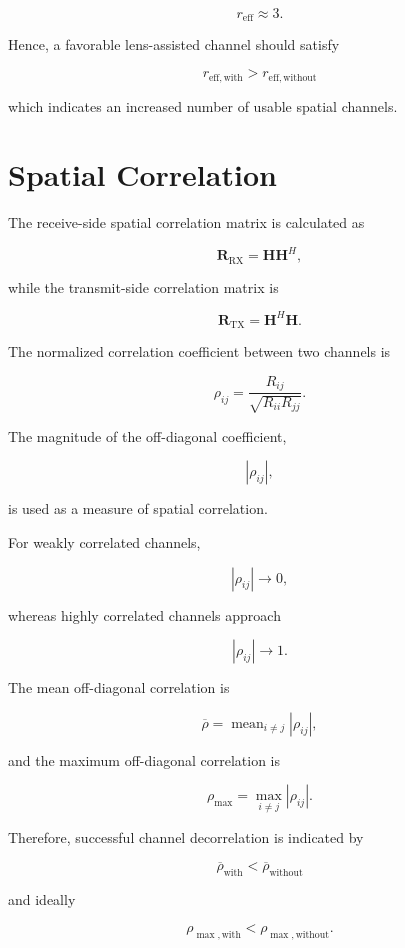 \documentclass[11pt,a4paper]{article}
\begin{document}
\[
r_{\mathrm{eff}}
\approx 3.
\]

Hence, a favorable lens-assisted channel should satisfy

\[
\boxed{
r_{\mathrm{eff,with}}
>
r_{\mathrm{eff,without}}
}
\]

which indicates an increased number of usable spatial channels.

\section{Spatial Correlation}

The receive-side spatial correlation matrix is calculated as

\[
\mathbf{R}_{\mathrm{RX}}
=
\mathbf{H}\mathbf{H}^{H},
\]

while the transmit-side correlation matrix is

\[
\mathbf{R}_{\mathrm{TX}}
=
\mathbf{H}^{H}\mathbf{H}.
\]

The normalized correlation coefficient between two channels is

\[
\rho_{ij}
=
\frac{R_{ij}}
{\sqrt{R_{ii}R_{jj}}}.
\]

The magnitude of the off-diagonal coefficient,

\[
|\rho_{ij}|,
\]

is used as a measure of spatial correlation.

For weakly correlated channels,

\[
|\rho_{ij}|
\rightarrow 0,
\]

whereas highly correlated channels approach

\[
|\rho_{ij}|
\rightarrow 1.
\]

The mean off-diagonal correlation is

\[
\overline{\rho}
=
\operatorname{mean}_{i\neq j}
|\rho_{ij}|,
\]

and the maximum off-diagonal correlation is

\[
\rho_{\max}
=
\max_{i\neq j}
|\rho_{ij}|.
\]

Therefore, successful channel decorrelation is indicated by

\[
\boxed{
\overline{\rho}_{\mathrm{with}}
<
\overline{\rho}_{\mathrm{without}}
}
\]

and ideally

\[
\boxed{
\rho_{\max,\mathrm{with}}
<
\rho_{\max,\mathrm{without}}.
}
\]

\end{document}
